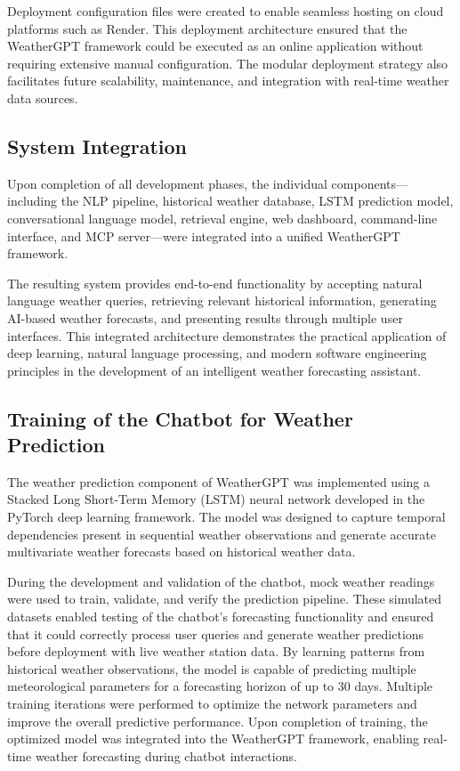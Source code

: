 \documentclass[12pt]{article}
\begin{document}
Deployment configuration files were created to enable seamless hosting on cloud platforms such as Render. This deployment architecture ensured that the WeatherGPT framework could be executed as an online application without requiring extensive manual configuration. The modular deployment strategy also facilitates future scalability, maintenance, and integration with real-time weather data sources.

\subsection{System Integration}
Upon completion of all development phases, the individual components—including the NLP pipeline, historical weather database, LSTM prediction model, conversational language model, retrieval engine, web dashboard, command-line interface, and MCP server—were integrated into a unified WeatherGPT framework.

The resulting system provides end-to-end functionality by accepting natural language weather queries, retrieving relevant historical information, generating AI-based weather forecasts, and presenting results through multiple user interfaces. This integrated architecture demonstrates the practical application of deep learning, natural language processing, and modern software engineering principles in the development of an intelligent weather forecasting assistant.

\subsection{Training of the Chatbot for Weather Prediction}
The weather prediction component of WeatherGPT was implemented using a Stacked Long Short-Term Memory (LSTM) neural network developed in the PyTorch deep learning framework. The model was designed to capture temporal dependencies present in sequential weather observations and generate accurate multivariate weather forecasts based on historical weather data.

During the development and validation of the chatbot, mock weather readings were used to train, validate, and verify the prediction pipeline. These simulated datasets enabled testing of the chatbot's forecasting functionality and ensured that it could correctly process user queries and generate weather predictions before deployment with live weather station data. By learning patterns from historical weather observations, the model is capable of predicting multiple meteorological parameters for a forecasting horizon of up to 30 days. Multiple training iterations were performed to optimize the network parameters and improve the overall predictive performance. Upon completion of training, the optimized model was integrated into the WeatherGPT framework, enabling real-time weather forecasting during chatbot interactions.
\end{document}
